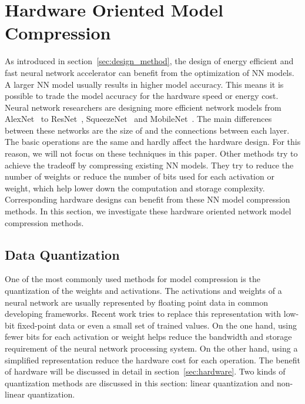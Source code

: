 \section{Hardware Oriented Model Compression}\label{sec:software}

As introduced in section~\ref{sec:design_method}, the design of energy efficient and fast neural network accelerator can benefit from the optimization of NN models. A larger NN model usually results in higher model accuracy. This means it is possible to trade the model accuracy for the hardware speed or energy cost. Neural network researchers are designing more efficient network models from AlexNet~\cite{krizhevsky2012imagenet} to ResNet~\cite{he2016deep}, SqueezeNet~\cite{iandola2016squeezenet} and MobileNet~\cite{Howard2017MobileNets}. The main differences between these networks are the size of and the connections between each layer. The basic operations are the same and hardly affect the hardware design. For this reason, we will not focus on these techniques in this paper. Other methods try to achieve the tradeoff by compressing existing NN models. They try to reduce the number of weights or reduce the number of bits used for each activation or weight, which help lower down the computation and storage complexity. Corresponding hardware designs can benefit from these NN model compression methods. In this section, we investigate these hardware oriented network model compression methods.

\subsection{Data Quantization}\label{sec:software:quant}
One of the most commonly used methods for model compression is the quantization of the weights and activations. The activations and weights of a neural network are usually represented by floating point data in common developing frameworks. Recent work tries to replace this representation with low-bit fixed-point data or even a small set of trained values. On the one hand, using fewer bits for each activation or weight helps reduce the bandwidth and storage requirement of the neural network processing system. On the other hand, using a simplified representation reduce the hardware cost for each operation. The benefit of hardware will be discussed in detail in section~\ref{sec:hardware}. Two kinds of quantization methods are discussed in this section: linear quantization and non-linear quantization.

